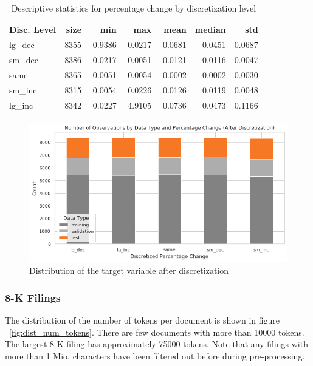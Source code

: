 \documentclass{article}
\begin{document}
	\begin{table}[h!]
		\centering
		\caption{Descriptive statistics for percentage change by discretization level}
		\label{table:stats_by_target}
	
		\begin{tabular}{lrrrrrr}
			\toprule
			Disc. Level &  size &     min &     max &    mean &  median &     std \\
			\midrule
			lg\_dec &  8355 & -0.9386 & -0.0217 & -0.0681 & -0.0451 &  0.0687 \\
			sm\_dec &  8386 & -0.0217 & -0.0051 & -0.0121 & -0.0116 &  0.0047 \\
			same   &  8365 & -0.0051 &  0.0054 &  0.0002 &  0.0002 &  0.0030 \\
			sm\_inc &  8315 &  0.0054 &  0.0226 &  0.0126 &  0.0119 &  0.0048 \\
			lg\_inc &  8342 &  0.0227 &  4.9105 &  0.0736 &  0.0473 &  0.1166 \\
			\bottomrule
		\end{tabular}
	\end{table}%


	\begin{figure}[h!]
	\includegraphics[width=\linewidth]{img/dist_target_disc.png}
	\caption{Distribution of the target variable after discretization}
	\label{fig:dist_target_disc}
	\end{figure}


	\subsubsection{8-K Filings}
	
	The distribution of the number of tokens per document is shown in figure ~\ref{fig:dist_num_tokens}. There are few documents with more than 10000 tokens. The largest 8-K filing has approximately 75000 tokens. Note that any filings with more than 1 Mio. characters have been filtered out before during pre-processing.
\end{document}
